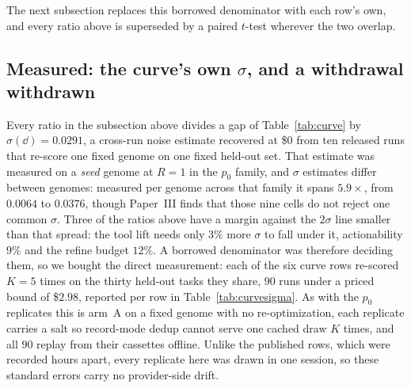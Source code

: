 \documentclass[11pt]{article}
\begin{document}
The next subsection replaces this borrowed denominator with each row's own, and every ratio above
is superseded by a paired $t$-test wherever the two overlap.

\subsection{Measured: the curve's own \texorpdfstring{$\sigma$}{sigma}, and a withdrawal withdrawn}
\label{sec:curverepeat}

Every ratio in the subsection above divides a gap of Table~\ref{tab:curve} by
$\sigma(\dd) = 0.0291$, a cross-run noise estimate recovered at \$0 from ten released runs that
re-score one fixed genome on one fixed held-out set. That estimate was measured on a \emph{seed}
genome at $R{=}1$ in the $p_0$ family, and $\sigma$ estimates differ between genomes: measured per
genome across that family it spans $5.9\times$, from $0.0064$ to $0.0376$, though Paper~III finds
that those nine cells do not reject one common $\sigma$. Three of the ratios
above have a margin against the $2\sigma$ line smaller than that spread: the
tool lift needs only $3\%$ more $\sigma$ to fall under it, actionability $9\%$ and the refine
budget $12\%$. A borrowed denominator was therefore deciding them, so we bought the direct
measurement: each of the six curve rows re-scored $K=5$ times on the thirty held-out tasks they
share, $90$ runs under a priced bound of \$$2.98$, reported per row in
Table~\ref{tab:curvesigma}. As with the $p_0$ replicates this is arm~A on a fixed genome with no
re-optimization, each replicate carries a salt so record-mode dedup cannot serve one cached draw
$K$ times, and all $90$ replay from their cassettes offline. Unlike the published rows, which were
recorded hours apart, every replicate here was drawn in one session, so these standard errors carry
no provider-side drift.
\end{document}
